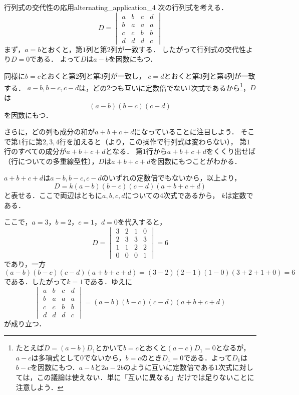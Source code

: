 \begin{example}{行列式の交代性の応用}{alternating_application_4}
  次の行列式を考える．
  \[
  D=
  \begin{vmatrix} 
    a & b & c & d \\
    b & a & a & a \\
    c & c & b & b \\
    d & d & d & c
  \end{vmatrix}
  \]
  まず，$a=b$とおくと，第$1$列と第$2$列が一致する．
  したがって行列式の交代性より$D=0$である．
  よって$D$は$a-b$を因数にもつ．

  同様に$b=c$とおくと第$2$列と第$3$列が一致し，
  $c=d$とおくと第$3$列と第$4$列が一致する．
  $a - b,b - c,c - d$は，どの$2$つも互いに定数倍でない$1$次式であるから\footnote{たとえば$D = (a - b)D_1$とかいて$b = c$とおくと$(a - c)D_1 = 0$となるが，$a - c$は多項式として$0$でないから，$b = c$のとき$D_1 = 0$である．よって$D_1$は$b - c$を因数にもつ．$a - b$と$2a - 2b$のように互いに定数倍である$1$次式に対しては，この議論は使えない．単に「互いに異なる」だけでは足りないことに注意しよう．}，$D$は
  \[
    (a-b)(b-c)(c-d)
  \]
  を因数にもつ．

  さらに，どの列も成分の和が$a+b+c+d$になっていることに注目しよう．
  そこで第$1$行に第$2,3,4$行を加えると（より，この操作で行列式は変わらない），
  第$1$行のすべての成分が$a + b + c + d$となる．
  第$1$行から$a + b + c + d$をくくり出せば（行についての多重線型性），$D$は$a+b+c+d$を因数にもつことがわかる．

  $a + b + c + d$は$a - b,b - c,c - d$のいずれの定数倍でもないから，以上より，
  \[
    D
    = k(a-b)(b-c)(c-d)(a+b+c+d)
  \]
  と表せる．ここで両辺はともに$a,b,c,d$についての$4$次式であるから，
  $k$は定数である．

  ここで，$a=3$，$b=2$，$c=1$，$d=0$を代入すると，
  \[
  D=
  \begin{vmatrix} 
    3 & 2 & 1 & 0 \\
    2 & 3 & 3 & 3 \\
    1 & 1 & 2 & 2 \\
    0 & 0 & 0 & 1
  \end{vmatrix}
  =6
  \]
  であり，一方
  \[
    (a-b)(b-c)(c-d)(a+b+c+d)
    =(3-2)(2-1)(1-0)(3+2+1+0)=6
  \]
  である．したがって$k=1$である．ゆえに
  \[
  \begin{vmatrix} 
    a & b & c & d \\
    b & a & a & a \\
    c & c & b & b \\
    d & d & d & c
  \end{vmatrix}
  =
  (a-b)(b-c)(c-d)(a+b+c+d)
  \]
  が成り立つ．
\end{example}

